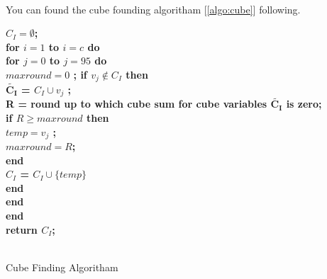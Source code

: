 \\[6mm]
You can found the cube founding algoritham [\ref{algo:cube}] following.
\begin{algorithm}[h]
	\nl \bf $C_I = \emptyset$;\\
	\nl \bf for ${i=1}$ to ${i=c}$ do\\
	\nl \bf \quad for ${j=0}$ to ${j=95}$ do \\
	\nl \bf \quad \quad $maxround = 0$ ; if $v_j \notin C_I$ then \\
	\nl \bf \quad \quad \quad $\tilde{\mathbf{C_I}}$ =  $C_I \cup v_j$  ; \\
	\nl \bf \quad \quad \quad R = round up to which cube sum for cube variables $\tilde{\mathbf{C_I}}$ is zero;\\
	\nl \bf \quad \quad \quad if $R \geq maxround$ then \\
	\nl \bf \quad \quad \quad \quad $temp = v_j$ ; \\
	\nl \bf \quad \quad \quad \quad $maxround = R$; \\
	\nl \bf \quad \quad \quad end \\
	\nl \bf \quad \quad \quad $C_I$ = $C_I \cup \{temp\}$\\
	\nl \bf \quad \quad end \\
	\nl \bf \quad end \\
	\nl \bf end \\
	\nl \bf return $C_I$; \\\
	
	\caption{Cube Finding Algoritham \cite{1930-5346_2019_0_107}}
	\label{algo:cube}
	
\end{algorithm}
